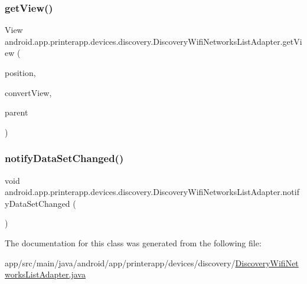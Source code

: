 \subsubsection{\texorpdfstring{get\+View()}{getView()}}
{\footnotesize\ttfamily View android.\+app.\+printerapp.\+devices.\+discovery.\+Discovery\+Wifi\+Networks\+List\+Adapter.\+get\+View (\begin{DoxyParamCaption}\item[{int}]{position,  }\item[{View}]{convert\+View,  }\item[{View\+Group}]{parent }\end{DoxyParamCaption})}

\mbox{\label{classandroid_1_1app_1_1printerapp_1_1devices_1_1discovery_1_1_discovery_wifi_networks_list_adapter_a863f10237303083bcb95a68676c89169}} 
\subsubsection{\texorpdfstring{notify\+Data\+Set\+Changed()}{notifyDataSetChanged()}}
{\footnotesize\ttfamily void android.\+app.\+printerapp.\+devices.\+discovery.\+Discovery\+Wifi\+Networks\+List\+Adapter.\+notify\+Data\+Set\+Changed (\begin{DoxyParamCaption}{ }\end{DoxyParamCaption})}



The documentation for this class was generated from the following file\+:\begin{DoxyCompactItemize}
\item 
app/src/main/java/android/app/printerapp/devices/discovery/\hyperlink{_discovery_wifi_networks_list_adapter_8java}{Discovery\+Wifi\+Networks\+List\+Adapter.\+java}\end{DoxyCompactItemize}
